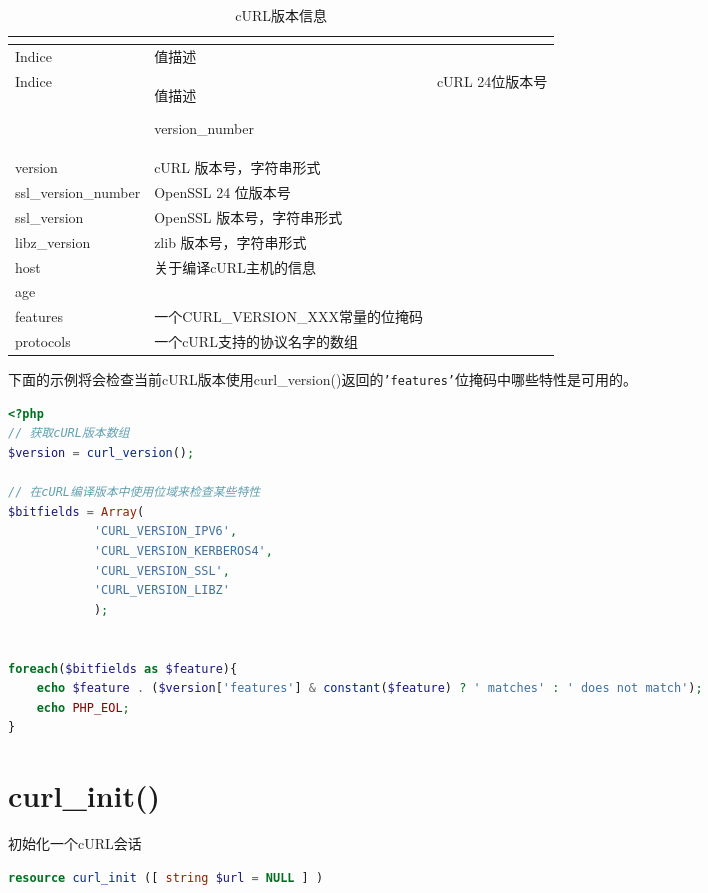 \begin{longtable}{|m{110pt}|m{200pt}|m{150pt}|}
\multicolumn{2}{r}{}
\tabularnewline\hline
Indice&值描述
\endhead

\caption{cURL版本信息}\\
\hline
Indice&值描述
\endfirsthead

\multicolumn{2}{r}{}
\endfoot

\endlastfoot
\hline
version\_number		&cURL 24位版本号\\
\hline
version				&cURL 版本号，字符串形式\\
\hline
ssl\_version\_number	&OpenSSL 24 位版本号\\
\hline
ssl\_version			&OpenSSL 版本号，字符串形式\\
\hline
libz\_version			&zlib 版本号，字符串形式\\
\hline
host					&关于编译cURL主机的信息\\
\hline
age	 				&\\
\hline
features				&一个CURL\_VERSION\_XXX常量的位掩码\\
\hline
protocols				&一个cURL支持的协议名字的数组\\
\hline
\end{longtable}

下面的示例将会检查当前cURL版本使用curl\_version()返回的\texttt{'features'}位掩码中哪些特性是可用的。

\begin{lstlisting}[language=PHP]
<?php
// 获取cURL版本数组
$version = curl_version();

// 在cURL编译版本中使用位域来检查某些特性
$bitfields = Array(
            'CURL_VERSION_IPV6', 
            'CURL_VERSION_KERBEROS4', 
            'CURL_VERSION_SSL', 
            'CURL_VERSION_LIBZ'
            );


foreach($bitfields as $feature){
    echo $feature . ($version['features'] & constant($feature) ? ' matches' : ' does not match');
    echo PHP_EOL;
}
\end{lstlisting}

\section{curl\_init()}


初始化一个cURL会话


\begin{lstlisting}[language=PHP]
resource curl_init ([ string $url = NULL ] )
\end{lstlisting}

